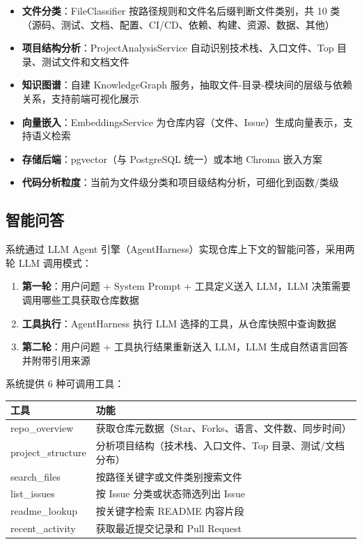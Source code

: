 \documentclass[10pt,a4paper]{article}
\newenvironment{ieeetable}{\begin{center}}{\end{center}}
\begin{document}
\begin{itemize}
    \item \textbf{文件分类}：FileClassifier 按路径规则和文件名后缀判断文件类别，共 10 类（源码、测试、文档、配置、CI/CD、依赖、构建、资源、数据、其他）
    \item \textbf{项目结构分析}：ProjectAnalysisService 自动识别技术栈、入口文件、Top 目录、测试文件和文档文件
    \item \textbf{知识图谱}：自建 KnowledgeGraph 服务，抽取文件-目录-模块间的层级与依赖关系，支持前端可视化展示
    \item \textbf{向量嵌入}：EmbeddingsService 为仓库内容（文件、Issue）生成向量表示，支持语义检索
    \item \textbf{存储后端}：pgvector（与 PostgreSQL 统一）或本地 Chroma 嵌入方案
    \item \textbf{代码分析粒度}：当前为文件级分类和项目级结构分析，可细化到函数/类级
\end{itemize}

\subsection{智能问答}

系统通过 LLM Agent 引擎（AgentHarness）实现仓库上下文的智能问答，采用两轮 LLM 调用模式：

\begin{enumerate}
    \item \textbf{第一轮}：用户问题 + System Prompt + 工具定义送入 LLM，LLM 决策需要调用哪些工具获取仓库数据
    \item \textbf{工具执行}：AgentHarness 执行 LLM 选择的工具，从仓库快照中查询数据
    \item \textbf{第二轮}：用户问题 + 工具执行结果重新送入 LLM，LLM 生成自然语言回答并附带引用来源
\end{enumerate}

系统提供 6 种可调用工具：

\begin{ieeetable}
    \begin{tabularx}{\textwidth}{L{3cm} X}
        \toprule
        \textbf{工具} & \textbf{功能} \\
        \midrule
        repo\_overview & 获取仓库元数据（Star、Forks、语言、文件数、同步时间） \\
        \midrule
        project\_structure & 分析项目结构（技术栈、入口文件、Top 目录、测试/文档分布） \\
        \midrule
        search\_files & 按路径关键字或文件类别搜索文件 \\
        \midrule
        list\_issues & 按 Issue 分类或状态筛选列出 Issue \\
        \midrule
        readme\_lookup & 按关键字检索 README 内容片段 \\
        \midrule
        recent\_activity & 获取最近提交记录和 Pull Request \\
        \bottomrule
    \end{tabularx}
\end{ieeetable}
\end{document}

